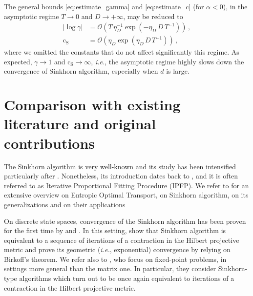 \documentclass[final,12pt]{colt2023} %
\def\ie{\textit{i.e.}}
\def\ie{\textit{i.e.}}
\def\cconst{\mathrm{c}_{\mathrm{S}}}
\begin{document}
The general bounds \eqref{eq:estimate_gamma} and \eqref{eq:estimate_c} (for $\alpha<0$), in the asymptotic regime  $T \to 0$ and $D \to + \infty$,  may be reduced to
\begin{align}
  |\log \gamma|&=\mathcal{O}\left(T \,\eta_D^{-1} \exp(- \eta_D \, D \,T^{-1})\right)\, ,\\
  \cconst&=\mathcal{O}(\eta_D \exp(\eta_D\, D \, T^{-1}))\, ,
\end{align}
where we omitted the constants that do not affect significantly this regime. As expected, $\gamma \to 1$ and $\cconst \to \infty$, \ie, the asymptotic regime highly slows down the convergence of Sinkhorn algorithm, especially when $d$ is large.






\section{Comparison with existing literature and original contributions}
  \label{sec:related_work}

The  Sinkhorn algorithm is very well-known and its study has been intensified particularly after \cite{cuturi2013sinkhorn}. Nonetheless, its introduction dates back to \cite{Yule12}, and it is often referred to as Iterative Proportional Fitting Procedure (IPFP).
We refer to  \cite{peyre2019computational} for an extensive overview on Entropic Optimal Transport, on Sinkhorn algorithm, on its generalizations and on their applications

 On discrete state spaces, convergence of the Sinkhorn algorithm has been proven for the first time by \cite{Sinkhorn64} and \cite{SinkhornKnopp67}. In this setting, \cite{Franklin89hilbert} show that Sinkhorn algorithm is equivalent to a sequence of iterations of a contraction in the Hilbert projective metric and prove its geometric (\ie, exponential) convergence by relying on Birkoff's theorem. We refer also to \cite{borwein1994entropy}, who focus on fixed-point problems, in settings more general than the matrix one. In particular, they consider Sinkhorn-type algorithms which turn out to be once again equivalent to iterations of a contraction in the Hilbert projective metric.
  
\end{document}
